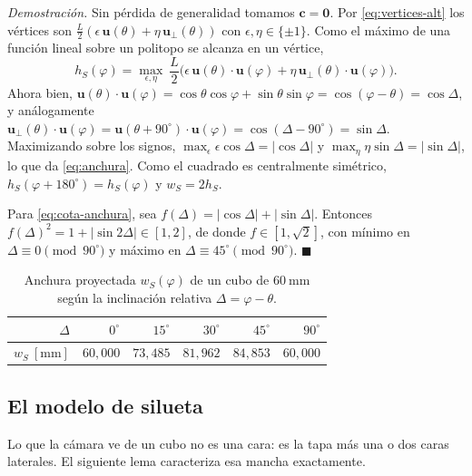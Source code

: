 \documentclass[11pt,a4paper]{article}
\theoremstyle{definition}
\newenvironment{demo}{\par\noindent\textit{Demostración.}\;}{\hfill$\blacksquare$\par\medskip}
\newcommand{\uu}{\mathbf{u}}
\newcommand{\cc}{\mathbf{c}}
\newcommand{\grados}{^{\circ}}
\begin{document}
\begin{demo}
Sin pérdida de generalidad tomamos $\cc = \mathbf 0$. Por \eqref{eq:vertices-alt} los
vértices son $\tfrac{L}{2}(\epsilon\,\uu(\theta) + \eta\,\uu_\perp(\theta))$ con
$\epsilon,\eta\in\{\pm1\}$. Como el máximo de una función lineal sobre un politopo se
alcanza en un vértice,
\[
  h_S(\varphi) = \max_{\epsilon,\eta}\ \frac{L}{2}\Big(\epsilon\,\uu(\theta)\cdot\uu(\varphi)
  + \eta\,\uu_\perp(\theta)\cdot\uu(\varphi)\Big).
\]
Ahora bien, $\uu(\theta)\cdot\uu(\varphi) = \cos\theta\cos\varphi + \sin\theta\sin\varphi
= \cos(\varphi-\theta) = \cos\Delta$, y análogamente
$\uu_\perp(\theta)\cdot\uu(\varphi) = \uu(\theta+90\grados)\cdot\uu(\varphi) =
\cos(\Delta - 90\grados) = \sin\Delta$. Maximizando sobre los signos,
$\max_{\epsilon}\epsilon\cos\Delta = |\cos\Delta|$ y
$\max_{\eta}\eta\sin\Delta = |\sin\Delta|$, lo que da \eqref{eq:anchura}. Como el
cuadrado es centralmente simétrico, $h_S(\varphi+180\grados) = h_S(\varphi)$ y
$w_S = 2h_S$.

Para \eqref{eq:cota-anchura}, sea $f(\Delta) = |\cos\Delta| + |\sin\Delta|$. Entonces
$f(\Delta)^2 = 1 + |\sin 2\Delta| \in [1,2]$, de donde $f \in [1,\sqrt2]$, con mínimo en
$\Delta \equiv 0 \pmod{90\grados}$ y máximo en $\Delta \equiv 45\grados \pmod{90\grados}$.
\end{demo}

\begin{table}[htbp]
\centering
\caption{Anchura proyectada $w_S(\varphi)$ de un cubo de $60\ \mathrm{mm}$ según la
inclinación relativa $\Delta = \varphi-\theta$.}
\begin{tabular}{rrrrrr}
\toprule
$\Delta$ & $0\grados$ & $15\grados$ & $30\grados$ & $45\grados$ & $90\grados$ \\
\midrule
$w_S\ [\mathrm{mm}]$ & $60{,}000$ & $73{,}485$ & $81{,}962$ & $84{,}853$ & $60{,}000$ \\
\bottomrule
\end{tabular}
\label{tab:anchura}
\end{table}

\subsection{El modelo de silueta}
\label{sec:silueta}

Lo que la cámara ve de un cubo no es una cara: es la tapa más una o dos caras laterales.
El siguiente lema caracteriza esa mancha exactamente.
\end{document}

